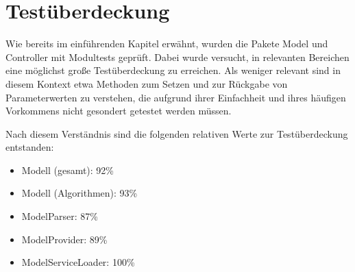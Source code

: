 \section{Testüberdeckung}

Wie bereits im einführenden Kapitel erwähnt, wurden die Pakete Model und Controller mit Modultests geprüft. Dabei wurde versucht, in relevanten Bereichen eine möglichst große Testüberdeckung zu erreichen. Als weniger relevant sind in diesem Kontext etwa Methoden zum Setzen und zur Rückgabe von Parameterwerten zu verstehen, die aufgrund ihrer Einfachheit und ihres häufigen Vorkommens nicht gesondert getestet werden müssen.

Nach diesem Verständnis sind die folgenden relativen Werte zur Testüberdeckung entstanden:

\begin{itemize}
\item Modell (gesamt): 92\%
\item Modell (Algorithmen): 93\%
\item ModelParser: 87\%
\item ModelProvider: 89\%
\item ModelServiceLoader: 100\%

\end{itemize}

